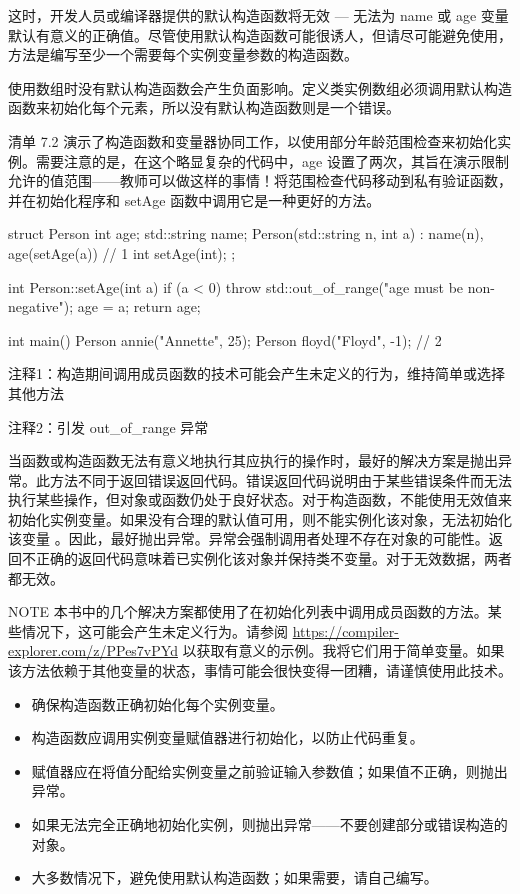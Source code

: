 这时，开发人员或编译器提供的默认构造函数将无效 — 无法为 name 或 age 变量默认有意义的正确值。尽管使用默认构造函数可能很诱人，但请尽可能避免使用，方法是编写至少一个需要每个实例变量参数的构造函数。

使用数组时没有默认构造函数会产生负面影响。定义类实例数组必须调用默认构造函数来初始化每个元素，所以没有默认构造函数则是一个错误。

清单 7.2 演示了构造函数和变量器协同工作，以使用部分年龄范围检查来初始化实例。需要注意的是，在这个略显复杂的代码中，age 设置了两次，其旨在演示限制允许的值范围——教师可以做这样的事情！将范围检查代码移动到私有验证函数，并在初始化程序和 setAge 函数中调用它是一种更好的方法。


\begin{cpp}
struct Person {
  int age;
  std::string name;
  Person(std::string n, int a) : name(n),
    age(setAge(a)) {} // 1
  int setAge(int);
};

int Person::setAge(int a) {
  if (a < 0)
    throw std::out_of_range("age must be non-negative");
  age = a;
  return age;
}

int main() {
  Person annie("Annette", 25);
  Person floyd("Floyd", -1); // 2
}
\end{cpp}

{\footnotesize
注释1：构造期间调用成员函数的技术可能会产生未定义的行为，维持简单或选择其他方法

注释2：引发 out\_of\_range 异常
}

当函数或构造函数无法有意义地执行其应执行的操作时，最好的解决方案是抛出异常。此方法不同于返回错误返回代码。错误返回代码说明由于某些错误条件而无法执行某些操作，但对象或函数仍处于良好状态。对于构造函数，不能使用无效值来初始化实例变量。如果没有合理的默认值可用，则不能实例化该对象，无法初始化该变量 。因此，最好抛出异常。异常会强制调用者处理不存在对象的可能性。返回不正确的返回代码意味着已实例化该对象并保持类不变量。对于无效数据，两者都无效。

\begin{myNotic}{NOTE}
本书中的几个解决方案都使用了在初始化列表中调用成员函数的方法。某些情况下，这可能会产生未定义行为。请参阅 \url{https://compiler-explorer.com/z/PPes7vPYd} 以获取有意义的示例。我将它们用于简单变量。如果该方法依赖于其他变量的状态，事情可能会很快变得一团糟，请谨慎使用此技术。
\end{myNotic}


\begin{itemize}
\item
确保构造函数正确初始化每个实例变量。

\item
构造函数应调用实例变量赋值器进行初始化，以防止代码重复。

\item
赋值器应在将值分配给实例变量之前验证输入参数值；如果值不正确，则抛出异常。

\item
如果无法完全正确地初始化实例，则抛出异常——不要创建部分或错误构造的对象。

\item
大多数情况下，避免使用默认构造函数；如果需要，请自己编写。
\end{itemize}
